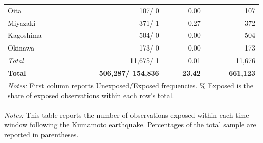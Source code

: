 \documentclass[
  letterpaper,
  DIV=11,
  numbers=noendperiod]{scrartcl}
\begin{document}
\begin{table}[htbp]
\begin{tabular}{lrrr}
\hspace{1em}Ōita        & 107/ 0        & 0.00  & 107     \\
\hspace{1em}Miyazaki    & 371/ 1        & 0.27  & 372     \\
\hspace{1em}Kagoshima   & 504/ 0        & 0.00  & 504     \\
\hspace{1em}Okinawa     & 173/ 0        & 0.00  & 173     \\
\hspace{1em}\textit{Total}       & 11,675/ 1     & 0.01  & 11,676  \\
\midrule
\textbf{Total}          & \textbf{506,287/ 154,836} & \textbf{23.42} & \textbf{661,123} \\
\bottomrule
\multicolumn{4}{p{0.75\textwidth}}{\scriptsize \textit{Notes:} First column reports Unexposed/Exposed frequencies. \% Exposed is the share of exposed observations within each row's total.} \\
\end{tabular}
\end{table}
\begin{table}[htbp]
\centering
\caption{Summary Statistics: Post-Kumamoto Exposure Variable}
\label{tab:summary_post}
\begin{threeparttable}
\begin{tablenotes}
\footnotesize
\item \textit{Notes:} This table reports the number of observations exposed within each time window following the Kumamoto earthquake. Percentages of the total sample are reported in parentheses.
\end{tablenotes}
\end{threeparttable}
\end{table}
\end{document}
